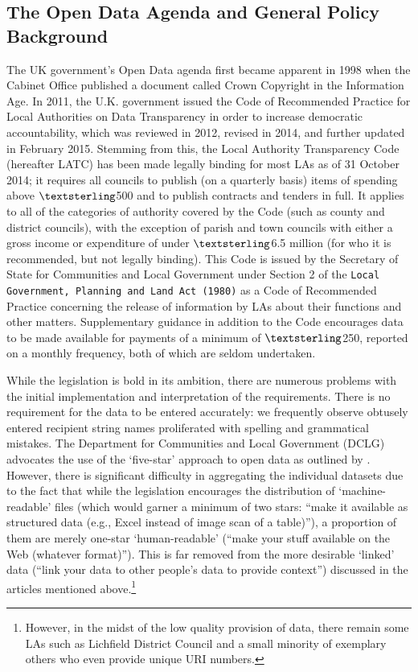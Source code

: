 \documentclass[11pt]{article}
\begin{document}
\subsection{The Open Data Agenda and General Policy Background}

The UK government's Open Data agenda first became apparent in 1998 when the Cabinet Office published a document called Crown Copyright in the Information Age. In 2011, the U.K. government issued the Code of Recommended Practice for Local Authorities on Data Transparency in order to increase democratic accountability, which was reviewed in 2012, revised in 2014, and further updated in February 2015. Stemming from this, the Local Authority Transparency Code (hereafter LATC) has been made legally binding for most LAs as of 31 October 2014; it requires all councils to publish (on a quarterly basis) items of spending above $\textsterling$500 and to publish contracts and tenders in full. It applies to all of the categories of authority covered by the Code (such as county and district councils), with the exception of parish and town councils with either a gross income or expenditure of under $\textsterling$6.5 million (for who it is recommended, but not legally binding). This Code is issued by the Secretary of State for Communities and Local Government under Section 2 of the \texttt{Local Government, Planning and Land Act (1980)} as a Code of Recommended Practice concerning the release of information by LAs about their functions and other matters. Supplementary guidance in addition to the Code encourages data to be made available for payments of a minimum of $\textsterling$250, reported on a monthly frequency, both of which are seldom undertaken. 

While the legislation is bold in its ambition, there are numerous problems with the initial implementation and interpretation of the requirements. There is no requirement for the data to be entered accurately: we frequently observe obtusely entered recipient string names proliferated with spelling and grammatical mistakes.  The Department for Communities and Local Government (DCLG) advocates the use of the `five-star' approach to open data as outlined by \cite{sirtim}. However, there is significant difficulty in aggregating the individual datasets due to the fact that while the legislation encourages the distribution of `machine-readable' files (which would garner a minimum of two stars: ``make it available as structured data (e.g., Excel instead of image scan of a table)''), a proportion of them are merely one-star `human-readable' (``make your stuff available on the Web (whatever format)''). This is far removed from the more desirable `linked' data (``link your data to other people's data to provide context'')  discussed in the articles mentioned above.\footnote{However, in the midst of the low quality provision of data, there remain some LAs such as Lichfield District Council and a small minority of exemplary others who even provide unique URI numbers.} 
\end{document}

